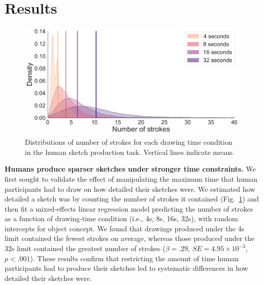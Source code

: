 \documentclass{article}
\begin{document}

\section{Results}
\begin{figure}
    \centering
    \includegraphics[width=.5\textwidth]{neurips_figures/neuripsDB_stroke_complexity_by_dd_edited.pdf}
    \caption{Distributions of number of strokes for each drawing time condition in the human sketch production task. Vertical lines indicate means.}
    \label{fig:dd_v_numstrokes}
    \vspace{-1em}
\end{figure}


\textbf{Humans produce sparser sketches under stronger time constraints.}
We first sought to validate the effect of manipulating the maximum time that human participants had to draw on how detailed their sketches were. 
We estimated how detailed a sketch was by counting the number of strokes it contained (Fig.~\ref{fig:dd_v_numstrokes}) and then fit a mixed-effects linear regression model predicting the number of strokes as a function of drawing-time condition (i.e., 4s, 8s, 16s, 32s), with random intercepts for object concept.
We found that drawings produced under the 4s limit contained the fewest strokes on average, whereas those produced under the 32s limit contained the greatest number of strokes ($\beta=.29$, $SE=4.95 \times10^{-3}$, $p<.001$).
These results confirm that restricting the amount of time human participants had to produce their sketches led to systematic differences in how detailed their sketches were.
\end{document}
